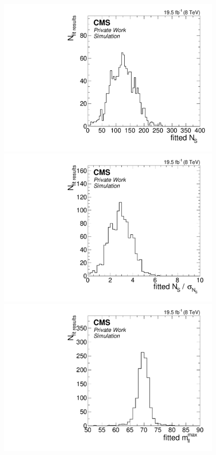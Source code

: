 \begin{figure}[hbp]
  \centering
  \begin{minipage}[t]{0.49\textwidth}
    \includegraphics[width=\textwidth]{plots/results/fit/toyResults/nSPure_signalInjected.pdf}
  \end{minipage}
  \begin{minipage}[t]{0.49\textwidth}
    \includegraphics[width=\textwidth]{plots/results/fit/toyResults/nS_signalInjected.pdf}
  \end{minipage}
  \begin{minipage}[t]{0.49\textwidth}
    \includegraphics[width=\textwidth]{plots/results/fit/toyResults/m0_signalInjected.pdf}

\end{minipage}
\end{figure}
